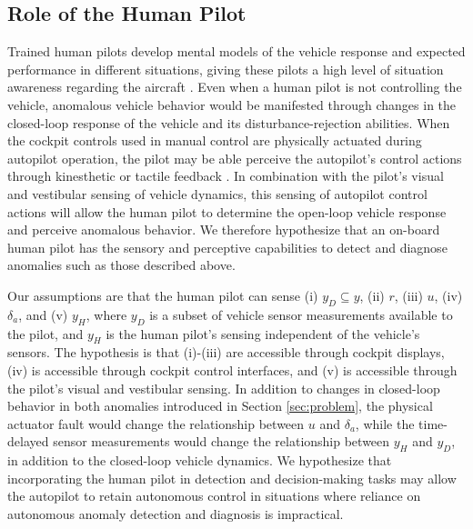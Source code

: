 \subsection{Role of the Human Pilot}
Trained human pilots develop mental models of the vehicle response and expected performance in different situations, giving these pilots a high level of situation awareness regarding the aircraft \cite{endsley1995toward}. Even when a human pilot is not controlling the vehicle, anomalous vehicle behavior would be manifested through changes in the closed-loop response of the vehicle and its disturbance-rejection abilities. When the cockpit controls used in manual control are physically actuated during autopilot operation, the pilot may be able perceive the autopilot's control actions through kinesthetic or tactile feedback \cite{tan1994human, yang2007development}. In combination with the pilot's visual and vestibular sensing of vehicle dynamics, this sensing of autopilot control actions will allow the human pilot to determine the open-loop vehicle response and perceive anomalous behavior. We therefore hypothesize that an on-board human pilot has the sensory and perceptive capabilities to detect and diagnose anomalies such as those described above. 

Our assumptions are that the human pilot can sense (i) $y_{D} \subseteq y$, (ii) $r$, (iii) $u$, (iv) $\delta_a$, and (v) $y_{H}$, where $y_{D}$ is a subset of vehicle sensor measurements available to the pilot, and $y_{H}$ is the human pilot's sensing independent of the vehicle's sensors. The hypothesis is that (i)-(iii) are accessible through cockpit displays, (iv) is accessible through cockpit control interfaces, and (v) is accessible through the pilot's visual and vestibular sensing. In addition to changes in closed-loop behavior in both anomalies introduced in Section \ref{sec:problem}, the physical actuator fault would change the relationship between $u$ and $\delta_a$, while the time-delayed sensor measurements would change the relationship between $y_{H}$ and $y_{D}$, in addition to the closed-loop vehicle dynamics. We hypothesize that incorporating the human pilot in detection and decision-making tasks may allow the autopilot to retain autonomous control in situations where reliance on autonomous anomaly detection and diagnosis is impractical. 


